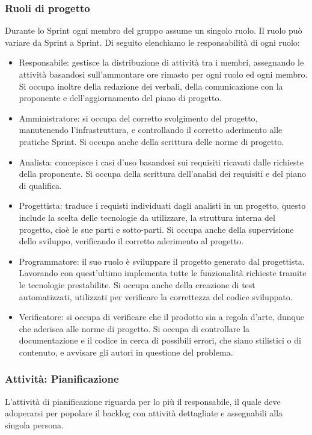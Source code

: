 \documentclass[a4paper,12pt]{article}
\begin{document}
\subsubsection{Ruoli di progetto}
Durante lo Sprint ogni membro del gruppo assume un singolo ruolo. Il ruolo può variare da Sprint a Sprint. Di seguito elenchiamo le responsabilità di ogni ruolo:
\begin{itemize}
    \item Responsabile: gestisce la distribuzione di attività tra i membri, assegnando le attività basandosi sull'ammontare ore rimasto per ogni ruolo ed ogni membro. Si occupa inoltre della redazione dei verbali, della comunicazione con la proponente e dell'aggiornamento del piano di progetto.
    \item Amministratore: si occupa del corretto svolgimento del progetto, manutenendo l'infrastruttura, e controllando il corretto aderimento alle pratiche Sprint. Si occupa anche della scrittura delle norme di progetto. 
    \item Analista: concepisce i casi d'uso basandosi sui requisiti ricavati dalle richieste della proponente. Si occupa della scrittura dell'analisi dei requisiti e del piano di qualifica.
    \item Progettista: traduce i requisti individuati dagli analisti in un progetto, questo include la scelta delle tecnologie da utilizzare, la struttura interna del progetto, cioè le sue parti e sotto-parti. Si occupa anche della supervisione dello sviluppo, verificando il corretto aderimento al progetto.
    \item Programmatore: il suo ruolo è sviluppare il progetto generato dal progettista. Lavorando con quest'ultimo implementa tutte le funzionalità richieste tramite le tecnologie prestabilite. Si occupa anche della creazione di test automatizzati, utilizzati per verificare la correttezza del codice sviluppato. 
    \item Verificatore: si occupa di verificare che il prodotto sia a regola d'arte, dunque che aderisca alle norme di progetto. Si occupa di controllare la documentazione e il codice in cerca di possibili errori, che siano stilistici o di contenuto, e avvisare gli autori in questione del problema.
\end{itemize}
\subsubsection{Attività: Pianificazione}
L'attività di pianificazione riguarda per lo più il responsabile, il quale deve adoperarsi per popolare il backlog con attività dettagliate e assegnabili alla singola persona.
\end{document}
